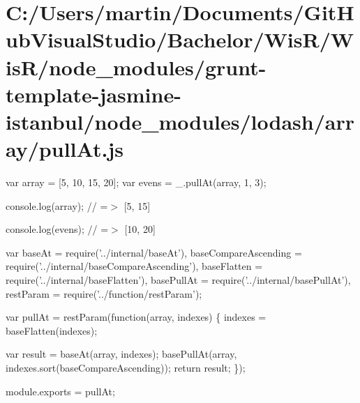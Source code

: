 \hypertarget{_c_1_2_users_2martin_2_documents_2_git_hub_visual_studio_2_bachelor_2_wis_r_2_wis_r_2node_moduled05df6815040473064b9ee6dd8785401}{}\section{C\+:/\+Users/martin/\+Documents/\+Git\+Hub\+Visual\+Studio/\+Bachelor/\+Wis\+R/\+Wis\+R/node\+\_\+modules/grunt-\/template-\/jasmine-\/istanbul/node\+\_\+modules/lodash/array/pull\+At.\+js}
var array = \mbox{[}5, 10, 15, 20\mbox{]}; var evens = \+\_\+.\+pull\+At(array, 1, 3);

console.\+log(array); // =$>$ \mbox{[}5, 15\mbox{]}

console.\+log(evens); // =$>$ \mbox{[}10, 20\mbox{]}


\begin{DoxyCodeInclude}
var baseAt = require(\textcolor{stringliteral}{'../internal/baseAt'}),
    baseCompareAscending = require(\textcolor{stringliteral}{'../internal/baseCompareAscending'}),
    baseFlatten = require(\textcolor{stringliteral}{'../internal/baseFlatten'}),
    basePullAt = require(\textcolor{stringliteral}{'../internal/basePullAt'}),
    restParam = require(\textcolor{stringliteral}{'../function/restParam'});

var pullAt = restParam(\textcolor{keyword}{function}(array, indexes) \{
  indexes = baseFlatten(indexes);

  var result = baseAt(array, indexes);
  basePullAt(array, indexes.sort(baseCompareAscending));
  \textcolor{keywordflow}{return} result;
\});

module.exports = pullAt;
\end{DoxyCodeInclude}
 
